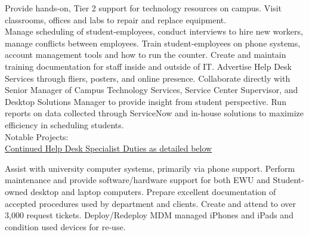 \documentclass[]{deedy-resume-openfont}
\begin{document}
\begin{minipage}[t]{0.66\textwidth}
\sectionsep
{}
Provide hands-on, Tier 2 support for technology resources on campus. Visit classrooms, offices and labs to repair and replace equipment.
\sectionsep \\
Manage scheduling of student-employees, conduct interviews to hire new workers, manage conflicts between employees. Train student-employees on phone systems, account management tools and how to run the counter. Create and maintain training documentation for staff inside and outside of IT. Advertise Help Desk Services through fliers, posters, and online presence. Collaborate directly with Senior Manager of Campus Technology Services, Service Center Supervisor, and Desktop Solutions Manager to provide insight from student perspective. Run reports on data collected through ServiceNow and in-house solutions to maximize efficiency in scheduling students. 
\\Notable Projects:\\
\underline{Continued Help Desk Specialist Duties as detailed below}\\ 

\sectionsep

Assist with university computer systems, primarily via phone support. Perform maintenance and provide software/hardware support for both EWU and Student-owned desktop and laptop computers. Prepare excellent documentation of accepted procedures used by department and clients. Create and attend to over 3,000 request tickets. Deploy/Redeploy MDM managed iPhones and iPads and condition used devices for re-use.


\end{minipage}
\end{document}
